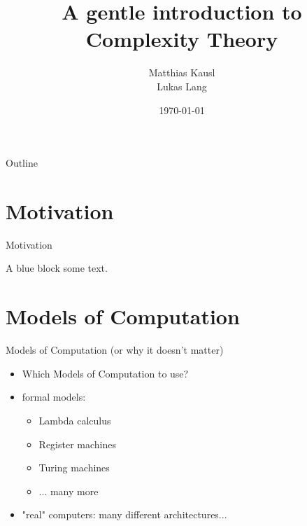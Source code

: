\documentclass[c]{beamer}
\title{A gentle introduction to Complexity Theory}
\author{Matthias Kausl \\ Lukas Lang}
\institute{Vienna University of Technology}
\date{\today}
\begin{document}
\begin{frame}
\titlepage
\end{frame}

\begin{frame}{Outline}
	\tableofcontents
\end{frame}

\section{Motivation}

\begin{frame}{Motivation}
          
	\begin{block}{A blue block}
		some text.
          \end{block}
\end{frame}

\section{Models of Computation}
\begin{frame}{Models of Computation (or why it doesn't matter)}
          \begin{itemize}
			\item Which Models of Computation to use?
			\item formal models:
			\begin{itemize}
				\item Lambda calculus
				\item Register machines
				\item Turing machines
				\item ... many more
			\end{itemize}
			\item "real" computers: many different architectures...
		  \end{itemize}
\end{frame}		
\end{document}
